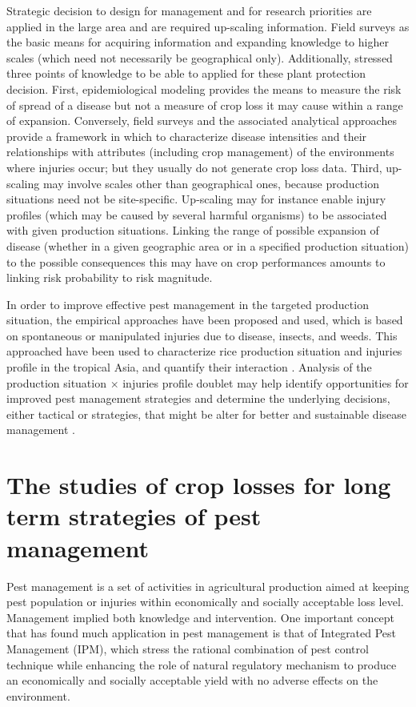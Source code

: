 Strategic decision to design for management and for research priorities are applied in the large area and are required up-scaling information. Field surveys as the basic means for acquiring information and expanding knowledge to higher scales (which need not necessarily be geographical only). Additionally, \citet{Savary:2006to} stressed three points of knowledge to be able to applied for these plant protection decision. First, epidemiological modeling provides the means to measure the risk of spread of a disease but not a measure of crop loss it may cause within a range of expansion. Conversely, field surveys and the associated analytical approaches provide a framework in which to characterize disease intensities and their relationships with attributes (including crop management) of the environments where injuries occur; but they usually do not generate crop loss data. Third, up-scaling may involve scales other than geographical ones, because production situations need not be site-specific. Up-scaling may for instance enable injury profiles (which may be caused by several harmful organisms) to be associated with given production situations. Linking the range of possible expansion of disease (whether in a given geographic area or in a specified production situation) to the possible consequences this may have on crop performances amounts to linking risk probability to risk magnitude.

In order to improve effective pest management in the targeted production situation, the empirical approaches have been proposed and used, which is based on spontaneous or manipulated injuries due to disease, insects, and weeds. This approached have been used to characterize rice production situation and injuries profile in the tropical Asia, and quantify their interaction \cite{Savary:2000vr}. Analysis of the production situation $\times$ injuries profile doublet may help identify opportunities for improved pest management strategies and determine the underlying decisions, either tactical or strategies, that might be alter for better and sustainable disease management \cite{Mew:2004kh}.


\section*{The studies of crop losses for long term strategies of pest management}

Pest management is a set of activities in agricultural production aimed at keeping pest population or injuries within economically and socially acceptable loss level. Management implied both knowledge and intervention. One important concept that has found much application in pest management is that of Integrated Pest Management (IPM), which stress the rational combination of pest control technique while enhancing the role of natural regulatory mechanism to produce an economically and socially acceptable yield with no adverse effects on the environment.

